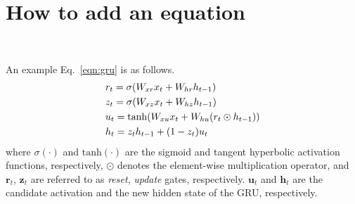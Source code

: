 \section{How to add an equation}~\label{sec:equations}

An example Eq.~\eqref{eqn:gru} is as follows.  
\begin{equation}
\vspace{0mm}
\begin{aligned}
\label{eqn:gru}
& r_t = \sigma( W_{xr} x_t + W_{hr} h_{t-1}) \\
& z_t = \sigma( W_{xz} x_t + W_{hz} h_{t-1}) \\
& u_t = \tanh( W_{xu} x_t + W_{hu} (  r_t \odot h_{t-1}))\\
& h_t =  z_t h_{t-1} + (1 - z_t) u_t\\
\end{aligned}
\vspace{0mm}
\end{equation}
where $\sigma(\cdot)$ and $\mbox{tanh}(\cdot)$ are the sigmoid and tangent hyperbolic activation functions, respectively, $\odot$ denotes the element-wise multiplication operator,
and $\mathbf{r}_t$,  $\mathbf{z}_t$ are referred to as {\em reset}, {\em update} gates, respectively. $\mathbf{u}_t$ and  $\mathbf{h}_t$ are the candidate activation and the new hidden state of the GRU, respectively.